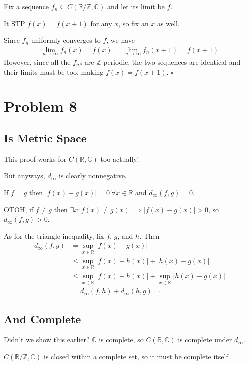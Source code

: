 \documentclass[12pt]{article}
\newcommand{\R}{\mathbb{R}}
\newcommand{\Z}{\mathbb{Z}}
\newcommand{\C}{\mathbb{C}}
\begin{document}
Fix a sequence $f_n \subseteq C(\R/\Z, \C)$ and let its limit be $f$.

It STP $f(x)=f(x+1)$ for any $x$, so fix an $x$ as well.

Since $f_n$ uniformly converges to $f$, we have
\begin{align*}
  \lim_{n \to \infty} f_n(x)=f(x) && \lim_{n \to \infty} f_n(x+1)=f(x+1)
\end{align*}
However, since all the $f_n$s are $\Z$-periodic,
the two sequences are identical and their limits must be too, making $f(x)=f(x+1)$. $\square$

\section{Problem 8}

\subsection{Is Metric Space}

This proof works for $C(\R, \C)$ too actually!

But anyways, $d_\infty$ is clearly nonnegative.

If $f=g$ then $|f(x)-g(x)|=0\ \forall x \in \R$ and $d_\infty(f, g)=0$.

OTOH, if $f \ne g$ then $\exists x: f(x) \ne g(x) \implies |f(x)-g(x)| > 0$, so $d_\infty(f, g) > 0$.

As for the triangle inequality, fix $f$, $g$, and $h$.
Then
\begin{align*}
  d_\infty(f, g)
  &= \sup_{x \in \R} |f(x)-g(x)| \\
  &\le \sup_{x \in \R} |f(x)-h(x)|+|h(x)-g(x)| \\
  &\le \sup_{x \in \R} |f(x)-h(x)| + \sup_{x \in \R} |h(x)-g(x)| \\
  &= d_\infty(f, h) + d_\infty(h, g)\quad\square
\end{align*}

\subsection{And Complete}

Didn't we show this earlier?
$\C$ is complete, so $C(\R, \C)$ is complete under $d_\infty$.

$C(\R/\Z, \C)$ is closed within a complete set,
so it must be complete itself. $\square$
\end{document}
